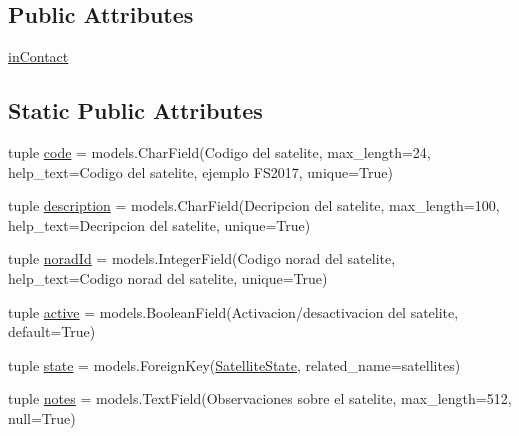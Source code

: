 \subsection*{Public Attributes}
\begin{DoxyCompactItemize}
\item 
\hyperlink{class_ground_segment_1_1models_1_1_satellite_1_1_satellite_a5bb0cfae504099155343019582b87213}{in\+Contact}
\end{DoxyCompactItemize}
\subsection*{Static Public Attributes}
\begin{DoxyCompactItemize}
\item 
tuple \hyperlink{class_ground_segment_1_1models_1_1_satellite_1_1_satellite_ae4a43a1ee941bff4914f4fed1e2775a1}{code} = models.\+Char\+Field(\textquotesingle{}Codigo del satelite\textquotesingle{}, max\+\_\+length=24, help\+\_\+text=\textquotesingle{}Codigo del satelite, ejemplo F\+S2017\textquotesingle{}, unique=True)
\item 
tuple \hyperlink{class_ground_segment_1_1models_1_1_satellite_1_1_satellite_a076215a5d0896cf97edbf312c7605000}{description} = models.\+Char\+Field(\textquotesingle{}Decripcion del satelite\textquotesingle{}, max\+\_\+length=100, help\+\_\+text=\textquotesingle{}Decripcion del satelite\textquotesingle{}, unique=True)
\item 
tuple \hyperlink{class_ground_segment_1_1models_1_1_satellite_1_1_satellite_a7962e5b81ff68f4fdedb33ce54bd4368}{norad\+Id} = models.\+Integer\+Field(\textquotesingle{}Codigo norad del satelite\textquotesingle{}, help\+\_\+text=\textquotesingle{}Codigo norad del satelite\textquotesingle{}, unique=True)
\item 
tuple \hyperlink{class_ground_segment_1_1models_1_1_satellite_1_1_satellite_a43cd47392c46ca0c6c7c92a8828d7d26}{active} = models.\+Boolean\+Field(\textquotesingle{}Activacion/desactivacion del satelite\textquotesingle{}, default=True)
\item 
tuple \hyperlink{class_ground_segment_1_1models_1_1_satellite_1_1_satellite_a4cdd4dae77da6f58058ca51ac71bd31d}{state} = models.\+Foreign\+Key(\hyperlink{class_ground_segment_1_1models_1_1_satellite_state_1_1_satellite_state}{Satellite\+State}, related\+\_\+name=\textquotesingle{}satellites\textquotesingle{})
\item 
tuple \hyperlink{class_ground_segment_1_1models_1_1_satellite_1_1_satellite_a6ae6b5fad6dd1a31200d8dd8e0ba07a0}{notes} = models.\+Text\+Field(\textquotesingle{}Observaciones sobre el satelite\textquotesingle{}, max\+\_\+length=512, null=True)

\end{DoxyCompactItemize}
